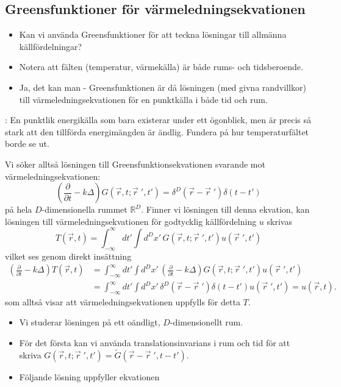 \documentclass[%
oneside,                 %
final,                   %
10pt]{article}
\newcommand{\longinlinecomment}[3]{{\color{red}{\bf #1}: #2}}
\begin{document}
\subsection*{Greensfunktioner för värmeledningsekvationen}

\begin{itemize}
\item Kan vi använda Greensfunktioner för att teckna lösningar till allmänna källfördelningar?

\item Notera att fälten (temperatur, värmekälla) är både rums- och tidsberoende.

\item Ja, det kan man - Greensfunktionen är då lösningen (med givna randvillkor) till värmeledningsekvationen för en punktkälla i både tid och rum.
\end{itemize}

\noindent
\longinlinecomment{Kommentar 3}{ En punktlik energikälla som bara existerar under ett ögonblick, men är precis så stark att den tillförda energimängden är ändlig. Fundera på hur temperaturfältet borde se ut. }{ En punktlik energikälla som }

Vi söker alltså lösningen till Greensfunktionsekvationen svarande mot värmeledningsekvationen:
$$   
\left( \frac{\partial}{\partial t}-k\Delta\right)G(\vec{r},t;\vec{r}{\;}',t')
=\delta^D(\vec{r}-\vec{r}{\;}')\delta(t-t')
$$
på hela $D$-dimensionella rummet $\mathbb{R}^D$. 
Finner vi lösningen till denna ekvation, kan lösningen till värmeledningsekvationen för godtycklig källfördelning $u$ skrivas
$$
T(\vec{r},t)=\int_{-\infty}^\infty dt'\int d^Dx'\, G(\vec{r},t;\vec{r}{\;}',t')u(\vec{r}{\;}',t')
$$
vilket ses genom direkt insättning
\begin{align}
\left( \frac{\partial}{\partial t}-k\Delta\right)T(\vec{r},t)
&=\int_{-\infty}^\infty dt'\int d^Dx'\,
\left( \frac{\partial}{\partial t}-k\Delta\right)G(\vec{r},t;\vec{r}{\;}',t')u(\vec{r}{\;}',t')
\nonumber \\ 
&=\int_{-\infty}^\infty dt'\int d^Dx'\,
\delta^D(\vec{r}-\vec{r}{\;}')\delta(t-t')u(\vec{r}{\;}',t')
=u(\vec{r},t).
\end{align}
som alltså visar att värmeledningsekvationen uppfylls för detta $T$.

\begin{itemize}
\item Vi studerar lösningen på ett oändligt, $D$-dimensionellt rum. 

\item För det första kan vi använda translationsinvarians i rum och tid för att skriva $G(\vec{r},t;\vec{r}{\;}',t') = \tilde G(\vec{r}-\vec{r}{\;}',t-t')$.

\item Följande lösning uppfyller ekvationen
\end{itemize}
\end{document}

